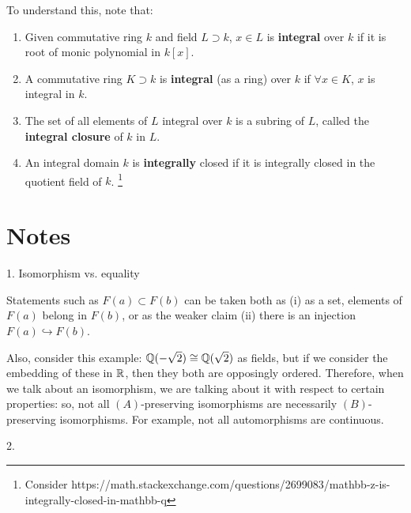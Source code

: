 \documentclass{article}
\begin{document}
To understand this, note that:
\begin{enumerate}
    \item Given commutative ring $k$ and field $L \supset k$, $x \in L$ is \textbf{integral} over $k$ if it is root of monic polynomial in $k[x]$.
    \item A commutative ring $K \supset k$ is \textbf{integral} (as a ring) over $k$ if $\forall x \in K$, $x$ is integral in $k$.
    \item The set of all elements of $L$ integral over $k$ is a subring of $L$, called the \textbf{integral closure} of $k$ in $L$.
    \item An integral domain $k$ is \textbf{integrally} closed if it is integrally closed in the quotient field of $k$. \footnote{Consider https://math.stackexchange.com/questions/2699083/mathbb-z-is-integrally-closed-in-mathbb-q}
\end{enumerate}

\section{Notes}

1. Isomorphism vs. equality

Statements such as $F(a) \subset F(b)$ can be taken both as (i) as a set, elements of $F(a)$ belong in $F(b)$, or as the weaker claim (ii) there is an injection $F(a) \hookrightarrow F(b)$.

Also, consider this example: $\mathbb{Q}(-\sqrt{2}) \cong \mathbb{Q}(\sqrt{2})$ as fields, but if we consider the embedding of these in $\mathbb{R}$, then they both are opposingly ordered. Therefore, when we talk about an isomorphism, we are talking about it with respect to certain properties: so, not all $(A)$-preserving isomorphisms are necessarily $(B)$-preserving isomorphisms. For example, not all automorphisms are continuous.

2. 
\end{document}
